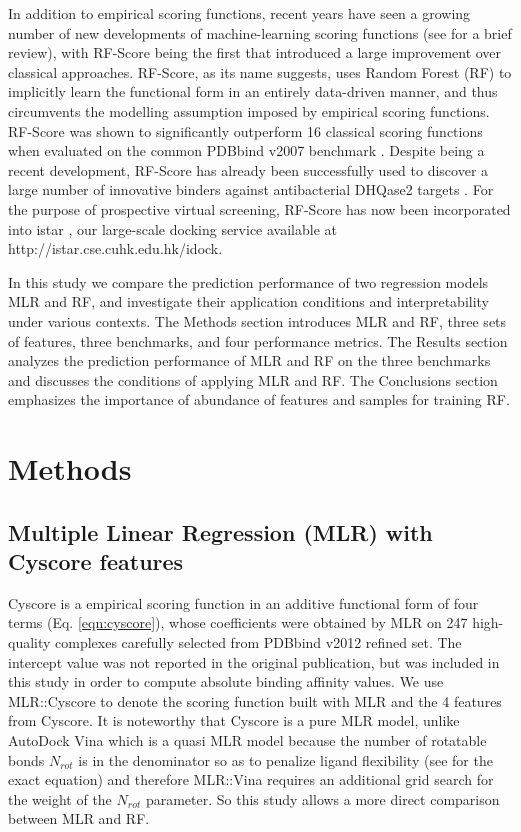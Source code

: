 \documentclass[journal=jacsat,manuscript=article]{achemso}
\begin{document}
In addition to empirical scoring functions, recent years have seen a growing number of new developments of machine-learning scoring functions (see \cite{1373} for a brief review), with RF-Score \cite{564} being the first that introduced a large improvement over classical approaches. RF-Score, as its name suggests, uses Random Forest (RF) \cite{1309} to implicitly learn the functional form in an entirely data-driven manner, and thus circumvents the modelling assumption imposed by empirical scoring functions. RF-Score was shown to significantly outperform 16 classical scoring functions when evaluated on the common PDBbind v2007 benchmark \cite{564}. Despite being a recent development, RF-Score has already been successfully used to discover a large number of innovative binders against antibacterial DHQase2 targets \cite{1281}. For the purpose of prospective virtual screening, RF-Score has now been incorporated into istar \cite{1362}, our large-scale docking service available at http://istar.cse.cuhk.edu.hk/idock.

In this study we compare the prediction performance of two regression models MLR and RF, and investigate their application conditions and interpretability under various contexts. The Methods section introduces MLR and RF, three sets of features, three benchmarks, and four performance metrics. The Results section analyzes the prediction performance of MLR and RF on the three benchmarks and discusses the conditions of applying MLR and RF. The Conclusions section emphasizes the importance of abundance of features and samples for training RF.

\section{Methods}

\subsection{Multiple Linear Regression (MLR) with Cyscore features}

Cyscore is a empirical scoring function in an additive functional form of four terms (Eq. \ref{eqn:cyscore}), whose coefficients were obtained by MLR on 247 high-quality complexes carefully selected from PDBbind v2012 refined set. The intercept value was not reported in the original publication, but was included in this study in order to compute absolute binding affinity values. We use MLR::Cyscore to denote the scoring function built with MLR and the 4 features from Cyscore. It is noteworthy that Cyscore is a pure MLR model, unlike AutoDock Vina \cite{595} which is a quasi MLR model because the number of rotatable bonds $N_{rot}$ is in the denominator so as to penalize ligand flexibility (see \cite{1362} for the exact equation) and therefore MLR::Vina requires an additional grid search for the weight of the $N_{rot}$ parameter. So this study allows a more direct comparison between MLR and RF.
\end{document}

